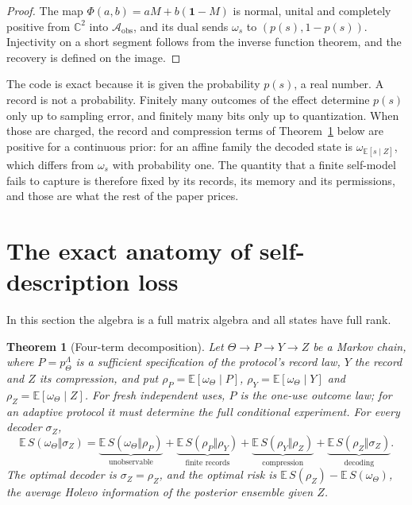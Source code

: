 \documentclass[12pt]{article}
\newtheorem{theorem}{Theorem}[section]
\theoremstyle{definition}
\theoremstyle{remark}
\newcommand{\E}{\mathbb E}
\begin{document}
\begin{proof}
The map $\Phi(a,b)=aM+b(\mathbf 1-M)$ is normal, unital and completely positive from $\mathbb C^2$ into $\mathcal A_{\mathrm{obs}}$, and its dual sends $\omega_s$ to $(p(s),1-p(s))$. Injectivity on a short segment follows from the inverse function theorem, and the recovery is defined on the image.
\end{proof}

The code is exact because it is given the probability $p(s)$, a real number. A record is not a probability. Finitely many outcomes of the effect determine $p(s)$ only up to sampling error, and finitely many bits only up to quantization. When those are charged, the record and compression terms of Theorem~\ref{thm:decomp} below are positive for a continuous prior: for an affine family the decoded state is $\omega_{\E[s\mid Z]}$, which differs from $\omega_s$ with probability one. The quantity that a finite self-model fails to capture is therefore fixed by its records, its memory and its permissions, and those are what the rest of the paper prices.

\section{The exact anatomy of self-description loss}\label{sec:3}

In this section the algebra is a full matrix algebra and all states have full rank.

\begin{theorem}[Four-term decomposition]\label{thm:decomp}
Let $\Theta\to P\to Y\to Z$ be a Markov chain, where $P=p^\Lambda_\Theta$ is a sufficient specification of the protocol's record law, $Y$ the record and $Z$ its compression, and put $\rho_P=\E[\omega_\Theta\mid P]$, $\rho_Y=\E[\omega_\Theta\mid Y]$ and $\rho_Z=\E[\omega_\Theta\mid Z]$. For fresh independent uses, $P$ is the one-use outcome law; for an adaptive protocol it must determine the full conditional experiment. For every decoder $\sigma_Z$,
\begin{equation}\label{eq:decomp}
\E\,S(\omega_\Theta\Vert\sigma_Z)=\underbrace{\E\,S(\omega_\Theta\Vert\rho_P)}_{\text{unobservable}}
+\underbrace{\E\,S(\rho_P\Vert\rho_Y)}_{\text{finite records}}
+\underbrace{\E\,S(\rho_Y\Vert\rho_Z)}_{\text{compression}}
+\underbrace{\E\,S(\rho_Z\Vert\sigma_Z)}_{\text{decoding}}.
\end{equation}
The optimal decoder is $\sigma_Z=\rho_Z$, and the optimal risk is $\E\,S(\rho_Z)-\E\,S(\omega_\Theta)$, the average Holevo information of the posterior ensemble given $Z$.
\end{theorem}
\end{document}
